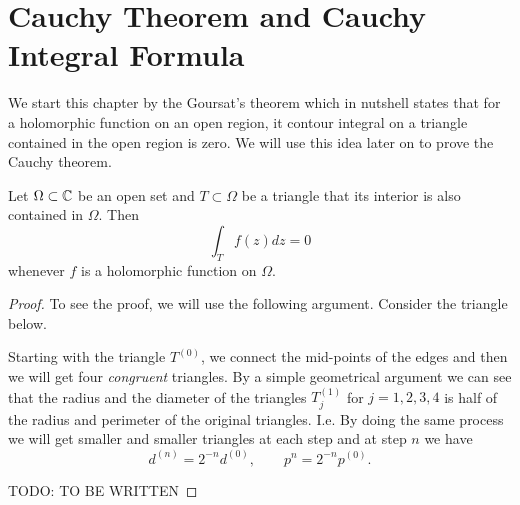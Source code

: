 \chapter{Cauchy Theorem and Cauchy Integral Formula}

We start this chapter by the Goursat's theorem which in nutshell states that for a holomorphic function on an open region, it contour integral on a triangle contained in the open region is zero. We will use this idea later on to prove the Cauchy theorem.


\begin{theorem}
	Let $ \Omega \subset \mathbb{C} $ be an open set and $ T \subset \Omega $ be a triangle that its interior is also contained in $ \Omega $. Then 
	\[ \int_T f(z) dz = 0 \]
	whenever $ f $ is a holomorphic function on $ \Omega $.
\end{theorem}

\begin{proof}
	To see the proof, we will use the following argument. Consider the triangle below.
	
	Starting with the triangle $ T^(0) $, we connect the mid-points of the edges and then we will get four \emph{congruent} triangles. By a simple geometrical argument we can see that the radius and the diameter of the triangles $ T^(1)_j $ for $ j=1,2,3,4 $ is half of the radius and perimeter of the original triangles. I.e. By doing the same process we will get smaller and smaller triangles at each step and at step $ n $ we have
	\[ d^(n) = 2^{-n} d^{(0)}, \qquad p^{n} = 2^{-n}p^{(0)}. \]
	
	{\color{red} \noindent TODO: TO BE WRITTEN}
	
\end{proof}